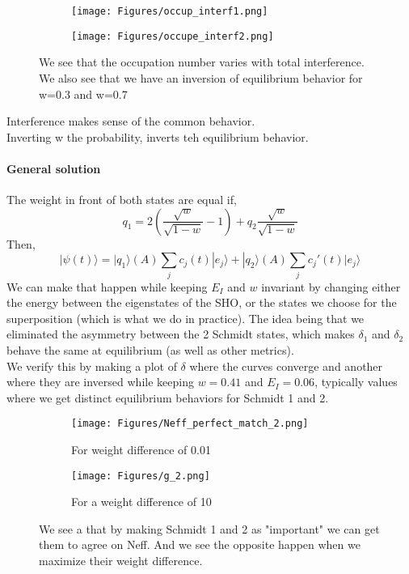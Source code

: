 \documentclass{article}
\begin{document}
\begin{figure}[h!]
  \centering
  \begin{subfigure}[b]{0.4\linewidth}
    \texttt{[image: Figures/occup\_interf1.png]}
    \label{fig:1}
  \end{subfigure}
  \begin{subfigure}[b]{0.4\linewidth}
    \texttt{[image: Figures/occupe\_interf2.png]}
    \label{fig:2}
  \end{subfigure}
  \caption{We see that the occupation number varies with total interference. We also see that we have an inversion of equilibrium behavior for w=0.3 and w=0.7}
  \label{fig:Occup_interf}
\end{figure}
{\color{teal} Interference makes sense of the common behavior.}\\
{\color{teal} Inverting w the probability, inverts teh equilibrium behavior. }


\paragraph{General solution}
The weight in front of both states are equal if,
\begin{equation}
    q_1=2(\frac{\sqrt{w}}{\sqrt{1-w}}-1)+q_2\frac{\sqrt{w}}{\sqrt{1-w}}
\end{equation}
Then,
\begin{equation}
    |\psi(t)\rangle=|q_1\rangle(A)\sum_jc_j(t)|e_j\rangle+|q_2\rangle(A)\sum_jc_j'(t)|e_j\rangle
\end{equation}
We can make that happen while keeping $E_I$ and $w$ invariant by changing either the energy between the eigenstates of the SHO, or the states we choose for the superposition (which is what we do in practice). {\color{teal}The idea being that we eliminated the asymmetry between the 2 Schmidt states, which makes $\delta_{1}$ and $\delta_2$ behave the same at equilibrium (as well as other metrics).}\\

We verify this by making a plot of $\delta$ where the curves converge and another where they are inversed while keeping $w=0.41$ and $E_I=0.06$, typically values where we get distinct equilibrium behaviors for Schmidt 1 and 2.

\begin{figure}[h!]
  \centering
  \begin{subfigure}[b]{0.4\linewidth}
    \texttt{[image: Figures/Neff\_perfect\_match\_2.png]}
    \caption{For weight difference of 0.01}
    \label{fig:1}
  \end{subfigure}
  \begin{subfigure}[b]{0.4\linewidth}
    \texttt{[image: Figures/g\_2.png]}
    \caption{For a weight difference of 10}
    \label{fig:2}
  \end{subfigure}
  \caption{We see a that by making Schmidt 1 and 2 as "important" we can get them to agree on Neff. And we see the opposite happen when we maximize their weight difference.}
  \label{fig:gif_compare_weight}
\end{figure}
\end{document}
